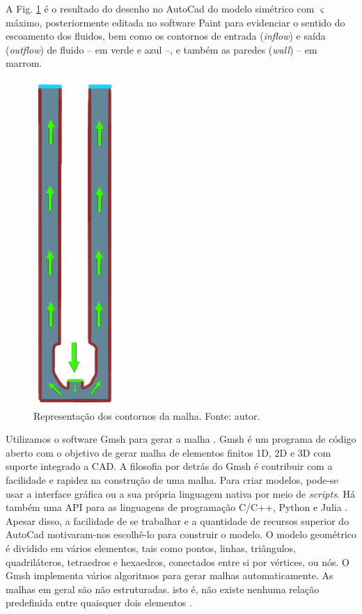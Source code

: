 A Fig. \ref{fig:contornos} é o resultado do desenho no AutoCad do modelo simétrico com $\varsigma$ máximo, posteriormente editada no software Paint para evidenciar o sentido do escoamento dos fluidos, bem como os contornos de entrada (\textit{inflow}) e saída (\textit{outflow}) de fluido – em verde e azul –, e também as paredes (\textit{wall}) – em marrom.
\begin{figure}[H]
	\centering
	\includegraphics[scale=0.7]{img/broca_petroleo_formacao_lisa_autocad2.png}
	\caption[Representação dos contornos da malha.]{Representação dos contornos da malha. Fonte: autor.}
	\label{fig:contornos}
\end{figure}

Utilizamos o software Gmsh para gerar a malha \cite{Gmsh}. Gmsh é um programa de código aberto com o objetivo de gerar malha de elementos finitos 1D, 2D e 3D com suporte integrado a CAD. A filosofia por detrás do Gmsh é contribuir com a facilidade e rapidez na construção de uma malha. Para criar modelos, pode-se usar a interface gráfica ou a sua própria linguagem nativa por meio de \textit{scripts}. Há também uma API para as linguagens de programação C/C++, Python e Julia \cite{Gmsh}. Apesar disso, a facilidade de se trabalhar e a quantidade de recursos superior do AutoCad motivaram-nos escolhê-lo para construir o modelo. O modelo geométrico é dividido em vários elementos, tais como pontos, linhas, triângulos, quadriláteros, tetraedros e hexaedros, conectados entre si por vértices, ou nós. O Gmsh implementa vários algoritmos para gerar malhas automaticamente. As malhas em geral são não estruturadas. isto é, não existe nenhuma relação predefinida entre quaisquer dois elementos \cite{GmshDocuments}.

